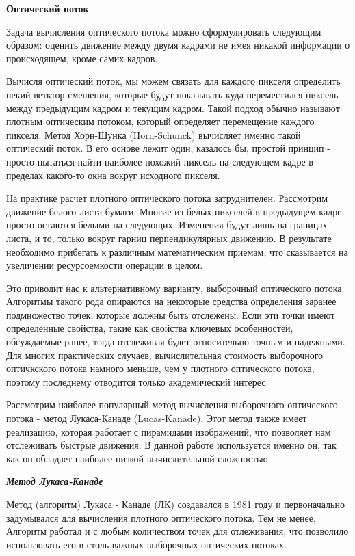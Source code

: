 \textbf{Оптический поток}

Задача вычисления оптического потока можно сформулировать следующим образом: оценить движение между двумя кадрами не имея никакой информации о происходящем, кроме самих кадров\cite{OpenCVBook}. 

Вычисля оптический поток, мы можем связать для каждого пикселя определить некий ветктор смешения, которые будут показывать куда переместился пиксель между предыдущим кадром и текущим кадром. Такой  подход обычно называют плотным оптическим потоком, который определяет перемещение каждого пикселя. Метод Хорн-Шунка (Horn-Schunck) вычисляет именно такой оптический поток. В его основе лежит один, казалось бы, простой принцип - просто пытаться найти наиболее похожий пиксель на следующем кадре в пределах какого-то окна вокруг исходного пикселя.

На практике расчет плотного оптического потока затруднителен. Рассмотрим движение белого листа бумаги. Многие из белых пикселей в предыдущем кадре просто остаются белыми на следующих. Изменения будут лишь на границах листа, и то, только вокруг гарниц перпендикулярных движению. В результате необходимо прибегать к различным математическим приемам, что сказывается на увеличении ресурсоемкости операции в целом. 

Это приводит нас к альтернативному варианту, выборочный оптического потока. Алгоритмы такого рода опираются на некоторые средства определения заранее подмножество точек, которые должны быть отслежены. Если эти точки имеют определенные свойства, такие как свойства ключевых особенностей, обсуждаемые ранее, тогда отслеживая будет относительно точным и надежными. Для многих практических случаев, вычислительная стоимость выборочного оптичкского потока намного меньше, чем у плотного оптического потока, поэтому последнему отводится только академический интерес.

Рассмотрим наиболее популярный метод вычисления выборочного оптического потока - метод Лукаса-Канаде (Lucas-Kanade). Этот метод также имеет реализацию, которая работает с пирамидами изображений, что позволяет нам отслеживать быстрые движения. В данной работе используется именно он, так как он обладает наиболее низкой вычислительной сложностью. 

{\large \textit{\textbf{Метод Лукаса-Канаде}}}

Метод (алгоритм) Лукаса - Канаде (ЛК) создавался в 1981 году и первоначально задумывался для вычисления плотного оптического потока. Тем не менее, Алгоритм работал и с любым количеством точек для отлеживания, что позволило использовать его в столь важных выборочных оптических потоках. 

